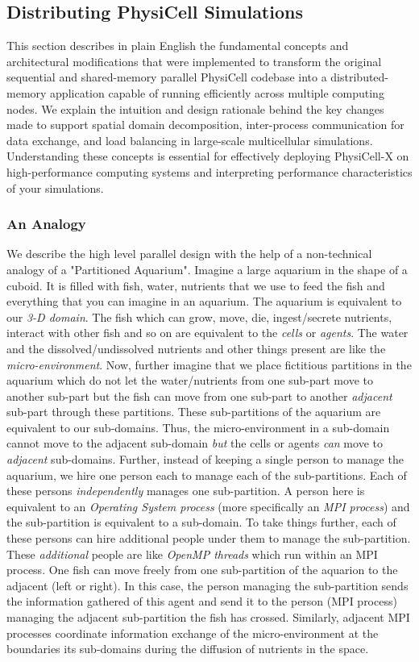 \documentclass[12pt]{article}
\begin{document}
\subsection{Distributing PhysiCell Simulations}
This section describes in plain English the fundamental concepts and architectural modifications that were implemented to transform the original sequential and shared-memory parallel PhysiCell codebase into a distributed-memory application capable of running efficiently across multiple computing nodes. We explain the intuition and design rationale behind the key changes made to support spatial domain decomposition, inter-process communication for data exchange, and load balancing in large-scale multicellular simulations. Understanding these concepts is essential for effectively deploying PhysiCell-X on high-performance computing systems and interpreting performance characteristics of your simulations.
\subsubsection{An Analogy}
We describe the high level parallel design with the help of a non-technical analogy of a "Partitioned Aquarium". Imagine a large aquarium in the shape of a cuboid. It is filled with fish, water, nutrients that we use to feed the fish and everything that you can imagine in an aquarium. The aquarium is equivalent to our \textit{3-D domain}. The fish which can grow, move, die, ingest/secrete nutrients, interact with other fish and so on are equivalent to the \textit{cells} or \textit{agents}. The water and the dissolved/undissolved nutrients and other things present are like the \textit{micro-environment}. Now, further imagine that we place fictitious partitions in the aquarium which do not let the water/nutrients from one sub-part move to another sub-part but the fish can move from one sub-part to another \textit{adjacent} sub-part through these partitions. These sub-partitions of the aquarium are equivalent to our sub-domains. Thus, the micro-environment in a sub-domain cannot move to the adjacent sub-domain \textit{but} the cells or agents \textit{can} move to \textit{adjacent} sub-domains. Further, instead of keeping a single person to manage the aquarium, we hire one person each to manage each of the sub-partitions. Each of these persons \textit{independently} manages one sub-partition. A person here is equivalent to an \textit{Operating System process} (more specifically an \textit{MPI process}) and the sub-partition is equivalent to a sub-domain. To take things further, each of these persons can hire additional people under them to manage the sub-partition. These \textit{additional} people are like \textit{OpenMP threads} which run within an MPI process. 
One fish can move freely from one sub-partition of the aquarion to the adjacent (left or right). In this case, the person managing the sub-partition sends the information gathered of this agent and send it to the person (MPI process) managing the adjacent sub-partition the fish has crossed. 
Similarly, adjacent MPI processes coordinate information exchange of the micro-environment at the boundaries its sub-domains during the diffusion of nutrients in the space.
\end{document}
